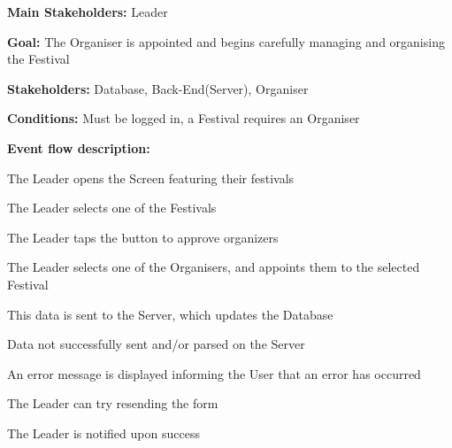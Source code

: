 				\noindent {}
				\begin{packed_item}
					\item \textbf{Main Stakeholders:} Leader
					\item \textbf{Goal:} The Organiser is appointed and begins carefully managing and organising the Festival
					\item \textbf{Stakeholders:} Database, Back-End(Server), Organiser
					\item \textbf{Conditions:} Must be logged in, a Festival requires an Organiser
					\item \textbf{Event flow description: }
					\begin{packed_enum}
						\item The Leader opens the Screen featuring their festivals
						\item The Leader selects one of the Festivals
						\item The Leader taps the button to approve organizers
						\item The Leader selects one of the Organisers, and appoints them to the selected Festival
						\item This data is sent to the Server, which updates the Database
					\end{packed_enum}
					
					\begin{packed_item}
						
						\item[4.a] Data not successfully sent and/or parsed on the Server
						\item[] \begin{packed_enum}
							\item An error message is displayed informing the User that an error has occurred
							\item The Leader can try resending the form
							\item The Leader is notified upon success
						\end{packed_enum}

					\end{packed_item}
				\end{packed_item}
			
